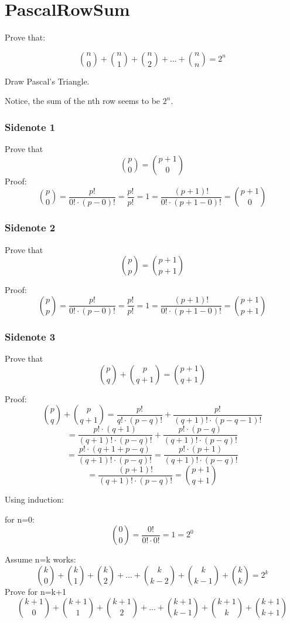 \documentclass[a4paper]{article}
\author{Emil Kerimov}
\numberwithin{equation}{subsection}
\begin{document}
\section{PascalRowSum}\label{PascalRowSum}


Prove that:

$${n \choose 0} + {n \choose 1} +
{n \choose 2}+...+{n \choose n} =2^n$$


Draw Pascal's Triangle. 


Notice, the sum of the nth row seems to be $2^n$.


\subsubsection{Sidenote 1}\label{pascal_sidenote1}
Prove that $${p \choose 0}={p+1 \choose 0}$$
Proof:
$${p \choose 0}=\frac{p!}{0! \cdot (p-0)!}=\frac{p!}{p!}=1=\frac{(p+1)!}{0! \cdot (p+1-0)!}={p+1 \choose 0}$$

\subsubsection{Sidenote 2 }\label{pascal_sidenote2}
Prove that $${p \choose p}={p+1 \choose p+1}$$

Proof:
$${p \choose p}=\frac{p!}{0! \cdot (p-0)!}=\frac{p!}{p!}=1=\frac{(p+1)!}{0! \cdot (p+1-0)!}={p+1 \choose p+1}$$

\subsubsection{Sidenote 3 }\label{pascal_sidenote3}
Prove that $${p \choose q} +{p \choose q+1}={p+1 \choose q+1}$$

Proof:
$${p \choose q} +{p \choose q+1}=\frac{p!}{q! \cdot (p-q)!}+\frac{p!}{(q+1)! \cdot (p-q-1)!} $$
$$=\frac{p! \cdot (q+1)}{(q+1)! \cdot (p-q)!}+\frac{p! \cdot (p-q)}{(q+1)! \cdot (p-q)!} $$
$$= \frac{p! \cdot (q+1+p-q)}{(q+1)! \cdot (p-q)!} = \frac{p! \cdot (p+1)}{(q+1)! \cdot (p-q)!}$$
$$=\frac{(p+1)!}{(q+1)! \cdot (p-q)!}={p+1 \choose q+1} $$


Using induction: 

for n=0:
$${0 \choose 0} = \frac{0!}{0! \cdot 0!}=1=2^0$$

Assume n=k works:
$${k \choose 0} + {k \choose 1} +
{k \choose 2}+...+{k \choose k-2}+{k \choose k-1}+{k \choose k} =2^k$$
Prove for n=k+1
$${k+1 \choose 0} + {k+1 \choose 1} +
{k+1 \choose 2}+...+{k+1 \choose k-1}+{k+1 \choose k}+{k+1 \choose k+1}$$
\end{document}
